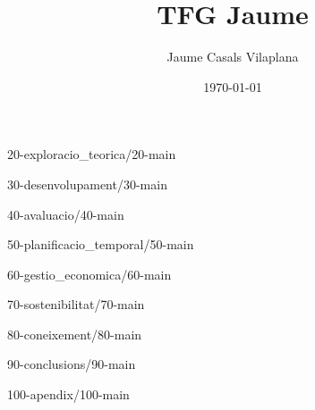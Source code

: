 \documentclass[a4paper, 12pt]{report}
\title{TFG Jaume}
\author{Jaume Casals Vilaplana}
\date{\today}
\begin{document}

\clearpage


\clearpage


\clearpage


{20-exploracio_teorica/20-main}
\clearpage

{30-desenvolupament/30-main}
\clearpage

{40-avaluacio/40-main}
\clearpage

{50-planificacio_temporal/50-main}
\clearpage

{60-gestio_economica/60-main}
\clearpage

{70-sostenibilitat/70-main}
\clearpage

{80-coneixement/80-main}
\clearpage

{90-conclusions/90-main}
\clearpage

{100-apendix/100-main}
\clearpage

\printbibliography[title={Referències}]

\appendix

\afterpage{\null\newpage}
\end{document}
